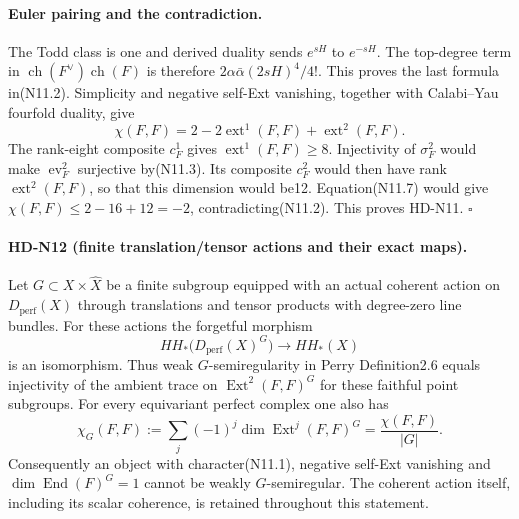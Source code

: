 \paragraph{Euler pairing and the contradiction.}
The Todd class is one and derived duality sends $e^{sH}$ to
$e^{-sH}$. The top-degree term in
$\operatorname{ch}(F^\vee)\operatorname{ch}(F)$ is therefore
$2\alpha\bar\alpha(2sH)^4/4!$. This proves the last formula
in(N11.2). Simplicity and negative self-Ext vanishing, together
with Calabi--Yau fourfold duality, give
\[
 \chi(F,F)=2-2\operatorname{ext}^1(F,F)
                   +\operatorname{ext}^2(F,F).             \tag{N11.7}
\]
The rank-eight composite $c_F^1$ gives
$\operatorname{ext}^1(F,F)\ge8$.
Injectivity of $\sigma_F^2$ would make
$\operatorname{ev}_F^2$ surjective by(N11.3). Its composite
$c_F^2$ would then have rank $\operatorname{ext}^2(F,F)$,
so that this dimension would be12. Equation(N11.7) would give
$\chi(F,F)\le2-16+12=-2$, contradicting(N11.2).
This proves HD-N11. \hfill$\square$

\paragraph{HD-N12 (finite translation/tensor actions and their exact maps).}
Let $G\subset X\times\widehat X$ be a finite subgroup equipped
with an actual coherent action on $D_{\mathrm{perf}}(X)$ through
translations and tensor products with degree-zero line bundles.
For these actions the forgetful morphism
\[
 HH_*\bigl(D_{\mathrm{perf}}(X)^G\bigr)
       \longrightarrow HH_*(X)                             \tag{N12.1}
\]
is an isomorphism. Thus weak $G$-semiregularity in Perry
Definition2.6 equals injectivity of the ambient trace on
$\operatorname{Ext}^2(F,F)^G$ for these faithful point subgroups.
For every equivariant perfect complex one also has
\[
 \chi_G(F,F):=\sum_j(-1)^j\dim\operatorname{Ext}^j(F,F)^G
                    =\frac{\chi(F,F)}{|G|}.               \tag{N12.2}
\]
Consequently an object with character(N11.1), negative
self-Ext vanishing and
$\dim\operatorname{End}(F)^G=1$ cannot be weakly
$G$-semiregular. The coherent action itself, including its scalar
coherence, is retained throughout this statement.

